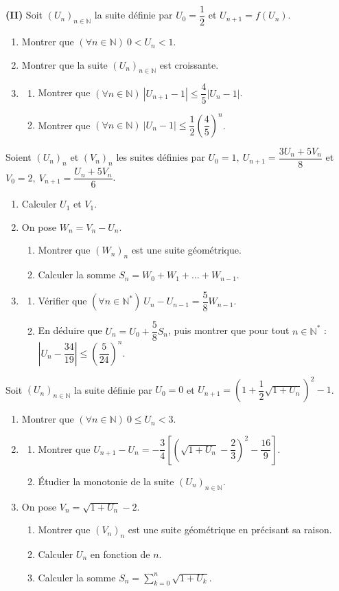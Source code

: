 \textbf{(II)} Soit $(U_n)_{n\in\mathbb{N}}$ la suite définie par $U_0=\dfrac12$ et $U_{n+1}=f(U_n)$.
\begin{enumerate}
\item Montrer que $(\forall n\in\mathbb{N})\ 0<U_n<1$.
\item Montrer que la suite $(U_n)_{n\in\mathbb{N}}$ est croissante.
\item \begin{enumerate}
\item Montrer que $(\forall n\in\mathbb{N})\ |U_{n+1}-1|\leq\dfrac45|U_n-1|$.
\item Montrer que $(\forall n\in\mathbb{N})\ |U_n-1|\leq\dfrac12\left(\dfrac45\right)^n$.
\end{enumerate}
\end{enumerate}
\fin
{}
Soient $(U_n)_n$ et $(V_n)_n$ les suites définies par
$U_0=1,\ U_{n+1}=\dfrac{3U_n+5V_n}{8}$ \quad et \quad $V_0=2,\ V_{n+1}=\dfrac{U_n+5V_n}{6}$.
\begin{enumerate}
\item Calculer $U_1$ et $V_1$.
\item On pose $W_n=V_n-U_n$.
\begin{enumerate}
\item Montrer que $(W_n)_n$ est une suite géométrique.
\item Calculer la somme $S_n=W_0+W_1+\dots+W_{n-1}$.
\end{enumerate}
\item \begin{enumerate}
\item Vérifier que $(\forall n\in\mathbb{N}^*)\ U_n-U_{n-1}=\dfrac58W_{n-1}$.
\item En déduire que $U_n=U_0+\dfrac58S_n$, puis montrer que pour tout $n\in\mathbb{N}^*$ : $\left|U_n-\dfrac{34}{19}\right|\leq\left(\dfrac{5}{24}\right)^n$.
\end{enumerate}
\end{enumerate}
\fin
{}
Soit $(U_n)_{n\in\mathbb{N}}$ la suite définie par $U_0=0$ et $U_{n+1}=\left(1+\dfrac12\sqrt{1+U_n}\right)^2-1$.
\begin{enumerate}
\item Montrer que $(\forall n\in\mathbb{N})\ 0\leq U_n<3$.
\item \begin{enumerate}
\item Montrer que $U_{n+1}-U_n=-\dfrac34\left[\left(\sqrt{1+U_n}-\dfrac23\right)^2-\dfrac{16}{9}\right]$.
\item Étudier la monotonie de la suite $(U_n)_{n\in\mathbb{N}}$.
\end{enumerate}
\item On pose $V_n=\sqrt{1+U_n}-2$.
\begin{enumerate}
\item Montrer que $(V_n)_n$ est une suite géométrique en précisant sa raison.
\item Calculer $U_n$ en fonction de $n$.
\item Calculer la somme $S_n=\displaystyle\sum_{k=0}^{n}\sqrt{1+U_k}$.
\end{enumerate}
\end{enumerate}
\fin
